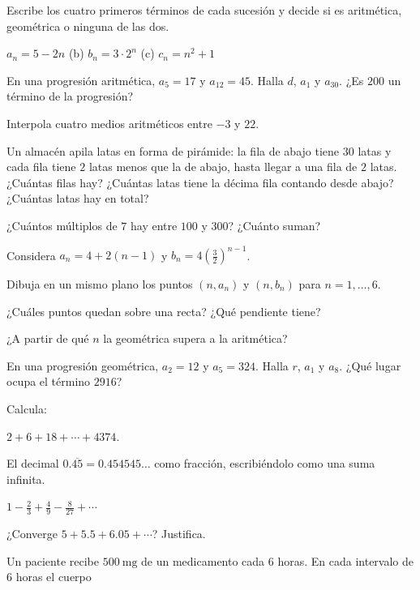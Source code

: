 \documentclass[11pt,a4paper]{article}
\begin{document}
\taller
\begin{ejercicios}
\item Escribe los cuatro primeros términos de cada sucesión y decide si es aritmética, geométrica o ninguna de las dos.
  \begin{ejercicios}
  \item $a_n=5-2n$ \qquad (b) $b_n=3\cdot 2^{n}$ \qquad (c) $c_n=n^{2}+1$
  \end{ejercicios}
\item En una progresión aritmética, $a_5=17$ y $a_{12}=45$. Halla $d$, $a_1$ y $a_{30}$. ¿Es $200$ un término de la progresión?
\item Interpola cuatro medios aritméticos entre $-3$ y $22$.
\item Un almacén apila latas en forma de pirámide: la fila de abajo tiene $30$ latas y cada fila tiene $2$ latas menos que
  la de abajo, hasta llegar a una fila de $2$ latas. ¿Cuántas filas hay? ¿Cuántas latas tiene la décima fila contando desde
  abajo? ¿Cuántas latas hay en total?
\item ¿Cuántos múltiplos de $7$ hay entre $100$ y $300$? ¿Cuánto suman?
\item Considera $a_n=4+2(n-1)$ y $b_n=4\left(\tfrac32\right)^{n-1}$.
  \begin{ejercicios}
  \item Dibuja en un mismo plano los puntos $(n,a_n)$ y $(n,b_n)$ para $n=1,\dots,6$.
  \item ¿Cuáles puntos quedan sobre una recta? ¿Qué pendiente tiene?
  \item ¿A partir de qué $n$ la geométrica supera a la aritmética?
  \end{ejercicios}
\item En una progresión geométrica, $a_2=12$ y $a_5=324$. Halla $r$, $a_1$ y $a_8$. ¿Qué lugar ocupa el término $2916$?
\item Calcula:
  \begin{ejercicios}
  \item $2+6+18+\cdots+4374$.
  \item El decimal $0.\overline{45}=0.454545\ldots$ como fracción, escribiéndolo como una suma infinita.
  \item $1-\frac23+\frac49-\frac{8}{27}+\cdots$
  \item ¿Converge $5+5.5+6.05+\cdots$? Justifica.
  \end{ejercicios}
\item Un paciente recibe $\SI{500}{\milli\gram}$ de un medicamento cada $6$ horas. En cada intervalo de $6$ horas el cuerpo

\end{ejercicios}
\end{document}
